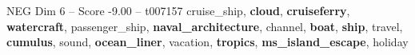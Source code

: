 \begin{textsample}{NEG Dim 6 – Score -9.00 – t007157}  \label{ex:f6_neg_017}
cruise\_ship, \textbf{cloud}, \textbf{cruiseferry}, \textbf{watercraft}, passenger\_ship, \textbf{naval\_architecture}, channel, \textbf{boat}, \textbf{ship}, travel, \textbf{cumulus}, sound, \textbf{ocean\_liner}, vacation, \textbf{tropics}, \textbf{ms\_island\_escape}, holiday

\end{textsample}

